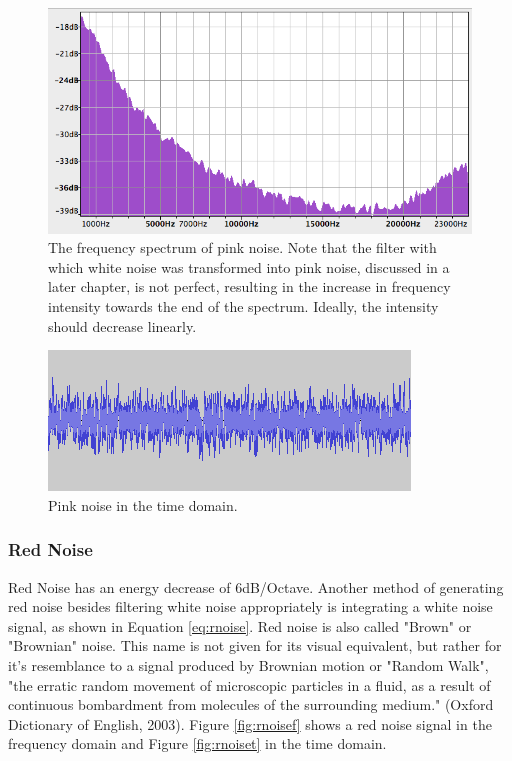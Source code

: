   \begin{figure}[t!]
    \includegraphics[scale=0.6]{img/pnoisef}
    \caption{The frequency spectrum of pink noise. Note that the filter with which white noise was transformed into pink noise, discussed in a later chapter, is not perfect, resulting in the increase in frequency intensity towards the end of the spectrum. Ideally, the intensity should decrease linearly.}
    \label{fig:pnoisef}
  \end{figure}

  \begin{figure}[t!]
    \includegraphics[scale=0.7]{img/pnoiset}
    \caption{Pink noise in the time domain.}
    \label{fig:pnoiset}
  \end{figure}

  \subsubsection{Red Noise}

  Red Noise has an energy decrease of 6dB/Octave. Another method of generating red noise besides filtering white noise appropriately is integrating a white noise signal, as shown in Equation \ref{eq:rnoise}. Red noise is also called "Brown" or "Brownian" noise. This name is not given for its visual equivalent, but rather for it's resemblance to a signal produced by Brownian motion or "Random Walk", "the erratic random movement of microscopic particles in a fluid, as a result of continuous bombardment from molecules of the surrounding medium." (Oxford Dictionary of English, 2003). Figure \ref{fig:rnoisef} shows a red noise signal in the frequency domain and Figure \ref{fig:rnoiset} in the time domain.

